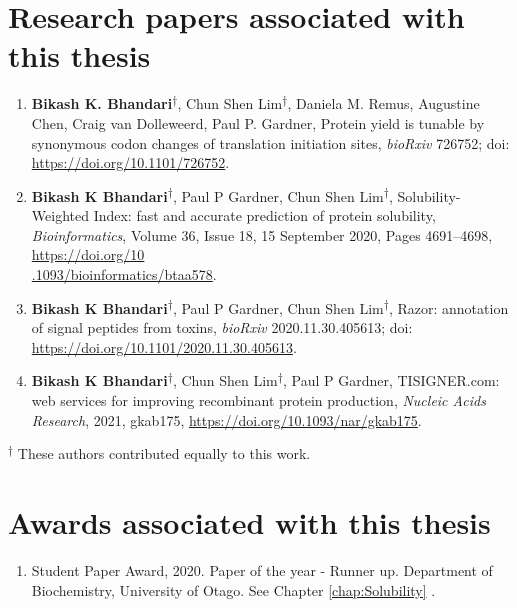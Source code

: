 \section*{Research papers associated with this thesis}
\begin{enumerate}
	
	\item \textbf{Bikash K. Bhandari}\textsuperscript{$\dagger$}, Chun Shen Lim\textsuperscript{$\dagger$}, Daniela M. Remus, Augustine Chen, Craig van Dolleweerd, Paul P. Gardner, Protein yield is tunable by synonymous codon changes of translation initiation sites, \textit{bioRxiv} 726752; doi: \href{https://doi.org/10.1101/726752}{https://doi.org/10.1101/726752}.
	
	\item \textbf{Bikash K Bhandari}\textsuperscript{$\dagger$}, Paul P Gardner, Chun Shen Lim\textsuperscript{$\dagger$}, Solubility-Weighted Index: fast and accurate prediction of protein solubility, \textit{Bioinformatics}, Volume 36, Issue 18, 15 September 2020, Pages 4691–4698, \href{https://doi.org/10.1093/bioinformatics/btaa578}{https://doi.org/10\\.1093/bioinformatics/btaa578}.
	
	\item \textbf{Bikash K Bhandari}\textsuperscript{$\dagger$}, Paul P Gardner, Chun Shen Lim\textsuperscript{$\dagger$}, Razor: annotation of signal peptides from toxins, \textit{bioRxiv} 2020.11.30.405613; doi: \href{https://doi.org/10.1101/2020.11.30.405613}{https://doi.org/10.1101/2020.11.30.405613}.
	
	
	\item \textbf{Bikash K Bhandari}\textsuperscript{$\dagger$}, Chun Shen Lim\textsuperscript{$\dagger$}, Paul P Gardner, TISIGNER.com: web services for improving recombinant protein production, \textit{Nucleic Acids Research}, 2021, gkab175, \href{https://doi.org/10.1093/nar/gkab175}{https://doi.org/10.1093/nar/gkab175}.
	
\end{enumerate}

\textsuperscript{$\dagger$} These authors contributed equally to this work.



\section*{Awards associated with this thesis}
\begin{enumerate}
	\item Student Paper Award, 2020. Paper of the year - Runner up. Department of Biochemistry, University of Otago. See Chapter \ref{chap:Solubility}  \cite{Bhandari2020-pz}.

\end{enumerate}